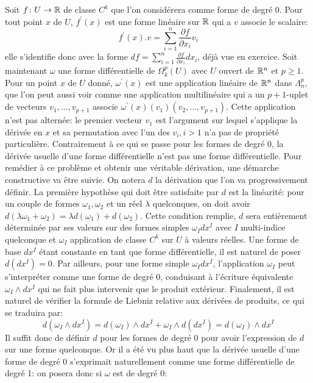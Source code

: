 Soit $f \colon U \to \mathbb{R}$ de classe $C^k$ que l'on considérera comme forme de degré 0. Pour tout point $x$ de $U$, $f^\prime(x)$ est une forme linéaire sur $\mathbb{R}$ qui a $v$ associe le scalaire:
\[
f^\prime(x).v = \sum_{i=1}^n \frac{\partial f}{\partial x_i} v_i 
\]
elle s'identifie donc avec la forme $df = \sum_{i=1}^n \frac{\partial f}{\partial x_i} dx_i$, déjà vue en exercice. 
Soit maintenant $\omega$ une forme différentielle de $\Omega_k^p(U)$ avec $U$ ouvert de $\mathbb{R}^n$ et $p \geq 1$. Pour un point $x$ de $U$ donné, $\omega^\prime(x)$ est une application linéaire de $\mathbb{R}^n$ dans $\Lambda_n^p$, que l'on peut aussi voir comme une application multilinéaire qui a un $p+1$-uplet de vecteurs $v_1, \dots, v_{p+1}$ associe $\omega^\prime(x)(v_1)(v_2,\dots,v_{p+1})$. Cette application n'est pas alternée: le premier vecteur $v_1$ est l'argument sur lequel s'applique la dérivée en $x$ et sa permutation avec l'un des $v_i, i > 1$ n'a pas de propriété particulière. Contrairement à ce qui se passe pour les formes de degré 0, la dérivée usuelle d'une forme différentielle n'est pas une forme différentielle. Pour remédier à ce problème et obtenir une véritable dérivation, une démarche constructive va être suivie. On notera $d$ la dérivation que l'on va progressivement définir. La première hypothèse qui doit être satisfaite par $d$ est la linéarité: pour un couple de formes $\omega_1,\omega_2$ et un réel $\lambda$ quelconques, on doit avoir $d\left(\lambda \omega_1 + \omega_2 \right) = \lambda d (\omega_1) + d (\omega_2)$. Cette condition remplie, $d$ sera entièrement déterminée par ses valeurs sur des formes simples $\omega_I dx^I$ avec $I$ multi-indice quelconque et $\omega_I$ application de classe $C^k$ sur $U$ à valeurs réelles. Une forme de base $dx^I$ étant constante en tant que forme différentielle, il est naturel de poser $d(dx^I) = 0$. Par ailleurs, pour une forme simple $\omega_I dx^I$, l'application $\omega_I$ peut s'interpréter comme une forme de degré 0, conduisant à l'écriture équivalente $\omega_I \wedge dx^I$ qui ne fait plus intervenir que le produit extérieur. Finalement, il est naturel de vérifier la formule de Liebniz relative aux dérivées de produits, ce qui se traduira par:
\[
d\left(\omega_I \wedge dx^I\right) = d(\omega_I) \wedge dx^I + \omega_I \wedge d\left(dx^I\right) = d(\omega_I) \wedge dx^I
\]
Il suffit donc de définir $d$ pour les formes de degré 0 pour avoir l'expression de $d$ sur une forme quelconque. Or il a été vu plus haut que la dérivée usuelle d'une forme de degré 0 s'exprimait naturellement comme une forme différentielle de degré 1: on posera donc si $\omega$ est de degré 0:
